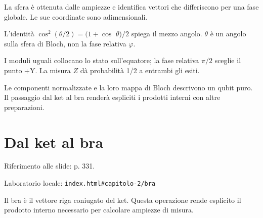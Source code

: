 La sfera è ottenuta dalle ampiezze e identifica vettori che differiscono per una fase globale. Le sue coordinate sono adimensionali.\par


\label{c2-stati-example-2-step-5}


L'identità \(\cos ^{2}(\theta /2)=(1+\cos \) \(\theta )/2\) spiega il mezzo angolo. \(\theta \) è un angolo sulla sfera di Bloch, non la fase relativa \(\varphi \).\par



I moduli uguali collocano lo stato sull'equatore; la fase relativa \(\pi /2\) sceglie il punto +Y. La misura \(Z\) dà probabilità 1/2 a entrambi gli esiti.\par


Le componenti normalizzate e la loro mappa di Bloch descrivono un qubit puro. Il passaggio dal ket al bra renderà espliciti i prodotti interni con altre preparazioni.\par


\Needspace{.43\textheight}
\section{Dal ket al bra}
\label{c2-bra}

{\sffamily\small\color{Ink!70} Riferimento alle slide: p. 331.\par}

{\sffamily\small\color{Ink!70} Laboratorio locale: \nolinkurl{index.html#capitolo-2/bra}\par}

Il bra è il vettore riga coniugato del ket. Questa operazione rende esplicito il prodotto interno necessario per calcolare ampiezze di misura.\par

